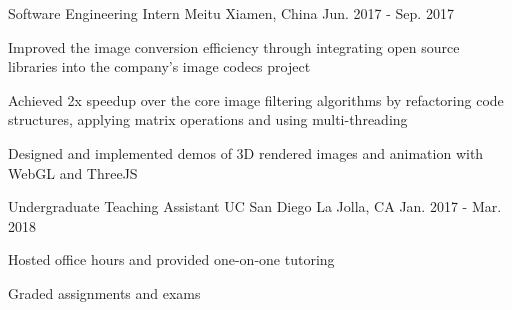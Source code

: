 \begin{cventries}
  \cventry
    {Software Engineering Intern} %
    {Meitu} %
    {Xiamen, China} %
    {Jun. 2017 - Sep. 2017} %
    {
      \begin{cvitems} %
        \item {Improved the image conversion efficiency through integrating open source libraries into the company's image codecs project}
        \item {Achieved 2x speedup over the core image filtering algorithms by refactoring code structures, applying matrix operations and using multi-threading}
        \item {Designed and implemented demos of 3D rendered images and animation with WebGL and ThreeJS}
      \end{cvitems}
    }


  \cventry
    {Undergraduate Teaching Assistant} %
    {UC San Diego} %
    {La Jolla, CA} %
    {Jan. 2017 - Mar. 2018} %
    {
      \begin{cvitems} %
        \item {Hosted office hours and provided one-on-one tutoring}
% 
% 
        \item {Graded assignments and exams}
      \end{cvitems}
    }


\end{cventries}
